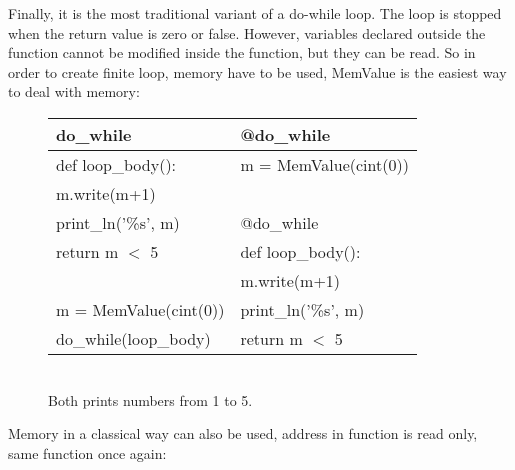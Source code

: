 Finally, it is the most traditional variant of a do-while loop. The loop is stopped when the return value is zero or false. However, variables declared outside the function cannot be modified inside the function, but they can be read. So in order to create finite loop, memory have to be used, MemValue is the easiest way to deal with memory:
\begin{figure}[h!]
\centering
\begin{tabular}{|l|l|} \hline
\textbf{do_while}                        & \textbf{@do_while}                       \\ \hline
def loop_body():                         & m = MemValue(cint(0))                    \\
\hspace{5 mm}m.write(m+1)                &                                          \\
\hspace{5 mm}print_ln('\%s', m)          & @do_while                                \\
\hspace{5 mm}return m $<$ 5              & def loop_body():                         \\
                                         & \hspace{5 mm}m.write(m+1)                \\
m = MemValue(cint(0))                    & \hspace{5 mm}print_ln('\%s', m)          \\
do_while(loop_body)                      & \hspace{5 mm}return m $<$ 5              \\ \hline
\end{tabular}
\begin{footnotesize}
\\ Both prints numbers from 1 to 5.
\end{footnotesize}
\end{figure}
Memory in a classical way can also be used, address in function is read only, same function once again:

